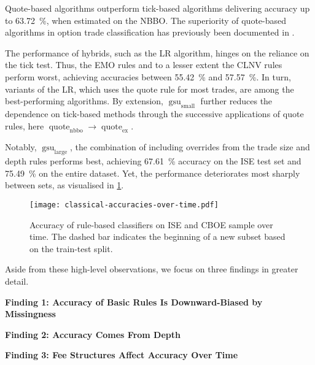Quote-based algorithms outperform tick-based algorithms delivering accuracy up to \SI{63.72}{\percent}, when estimated on the \gls{NBBO}. The superiority of quote-based algorithms in option trade classification has previously been documented in \textcites{savickasInferringDirectionOption2003}{grauerOptionTradeClassification2022}.

The performance of hybrids, such as the \gls{LR} algorithm, hinges on the reliance on the tick test. Thus, the \gls{EMO} rules and to a lesser extent the \gls{CLNV} rules perform worst, achieving accuracies between \SI{55.42}{\percent} and \SI{57.57}{\percent}. In turn, variants of the \gls{LR}, which uses the quote rule for most trades, are among the best-performing algorithms. By extension, $\operatorname{gsu}_{\mathrm{small}}$ further reduces the dependence on tick-based methods through the successive applications of quote rules, here $\operatorname{quote}_{\mathrm{nbbo}} \to \operatorname{quote}_{\mathrm{ex}}$.

Notably, $\operatorname{gsu}_{\mathrm{large}}$, the combination of \textcite[][33]{grauerOptionTradeClassification2022} including overrides from the trade size and depth rules performs best, achieving \SI{67.61}{\percent} accuracy on the \gls{ISE} test set and \SI{75.49}{\percent} on the entire dataset. Yet, the performance deteriorates most sharply between sets, as visualised in \cref{fig:classical-accuracies-over-time}.

\begin{figure}[ht]
    \centering
    \texttt{[image: classical-accuracies-over-time.pdf]}
    \caption[Accuracy Of Rule-Based Classifiers On  and  Over Time]{Accuracy of rule-based classifiers on \gls{ISE} and \gls{CBOE} sample over time. The dashed bar \myline{} indicates the beginning of a new subset based on the train-test split.}
    \label{fig:classical-accuracies-over-time}
\end{figure}

Aside from these high-level observations, we focus on three findings in greater detail.

\textbf{Finding 1: Accuracy of Basic Rules Is Downward-Biased by Missingness}

\textbf{Finding 2: Accuracy Comes From Depth}

\textbf{Finding 3: Fee Structures Affect Accuracy Over Time}

